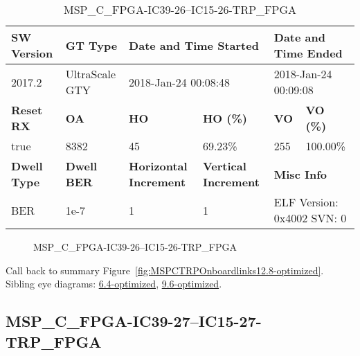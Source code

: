 \begin{table}[h]
\centering
\caption{MSP\_C\_FPGA-IC39-26--IC15-26-TRP\_FPGA}
\label{tab:MSPCFPGAIC3926IC1526TRPFPGA12.8-optimized}
\begin{tabular}{@{}|l|l|l|l|l|l|@{}}
\toprule
\textbf{SW Version}                & \textbf{GT Type}   & \multicolumn{2}{l|}{\textbf{Date and Time Started}}            & \multicolumn{2}{l|}{\textbf{Date and Time Ended}}        \\ \midrule
2017.2                       & UltraScale GTY          & \multicolumn{2}{l|}{2018-Jan-24 00:08:48}                   & \multicolumn{2}{l|}{2018-Jan-24 00:09:08}               \\ \midrule
\textbf{Reset RX}                  & \textbf{OA} & \textbf{HO}   & \textbf{HO (\%)} & \textbf{VO} & \textbf{VO (\%)} \\ \midrule
true & 8382        & 45          & 69.23\%        & 255        & 100.00\%       \\ \midrule
\textbf{Dwell Type}                & \textbf{Dwell BER} & \textbf{Horizontal Increment} & \textbf{Vertical Increment}    & \multicolumn{2}{l|}{\textbf{Misc Info}}                  \\ \midrule
BER                            & 1e-7        & 1        & 1           & \multicolumn{2}{l|}{ELF Version: 0x4002 SVN: 0}                         \\ \bottomrule
\end{tabular}
\end{table}

\begin{figure}[h]
\caption{MSP\_C\_FPGA-IC39-26--IC15-26-TRP\_FPGA} \label{fig:MSPCFPGAIC3926IC1526TRPFPGA12.8-optimized}
\end{figure}

Call back to summary Figure~\ref{fig:MSPCTRPOnboardlinks12.8-optimized}.
Sibling eye diagrams: \hyperref[sec:MSPCFPGAIC3926IC1526TRPFPGA6.4-optimized]{6.4-optimized}, \hyperref[sec:MSPCFPGAIC3926IC1526TRPFPGA9.6-optimized]{9.6-optimized}.

\clearpage
\newpage


\subsection{MSP\_C\_FPGA-IC39-27--IC15-27-TRP\_FPGA}\label{sec:MSPCFPGAIC3927IC1527TRPFPGA12.8-optimized}

